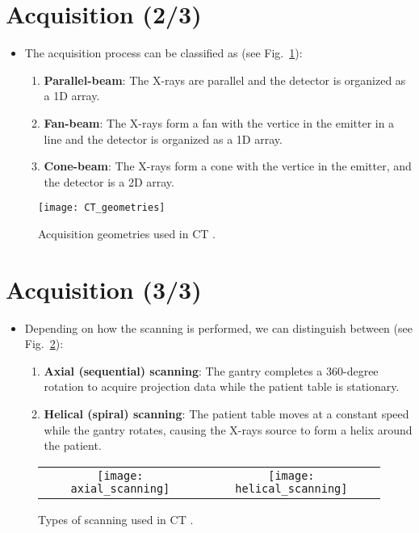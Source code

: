 \section{Acquisition (2/3)}
\begin{itemize}
\item The acquisition process can be classified as
(see Fig.~\ref{fig:CT_geometries}):
\begin{enumerate}
\item \textbf{Parallel-beam}: The X-rays are parallel and the detector
  is organized as a 1D array.
\item \textbf{Fan-beam}: The X-rays form a fan with the vertice in the
  emitter in a line and the detector is organized as a 1D array.
\item \textbf{Cone-beam}: The X-rays form a cone with the
  vertice in the emitter, and the detector is a 2D array.
\end{enumerate}
\end{itemize}
\vspace{-5ex}
\begin{figure}[!b]
  \centering
  \texttt{[image: CT\_geometries]}
  \caption{Acquisition geometries used in CT \cite{takase2025CT}.\label{fig:CT_geometries}}
\end{figure}

\section{Acquisition (3/3)}
\begin{itemize}
\item Depending on how the scanning is performed, we can distinguish between
(see Fig.~\ref{fig:scannings}):
\begin{enumerate}
\item \textbf{Axial (sequential) scanning}:
  The gantry completes a 360-degree rotation to acquire projection
  data while the patient table is stationary. 
\item \textbf{Helical (spiral) scanning}: The patient table moves
  at a constant speed while the gantry rotates, causing the X-rays
  source to form a helix around the patient.
\end{enumerate}
\end{itemize}
\begin{figure}[!b]
  \centering
  \begin{tabular}{cc}
    \texttt{[image: axial\_scanning]} & \texttt{[image: helical\_scanning]}
  \end{tabular}
  \caption{Types of scanning used in CT \cite{abdulla2025acquiring1}.\label{fig:scannings}}
\end{figure}

